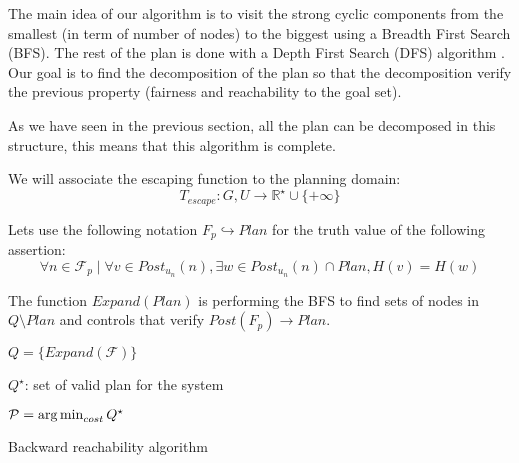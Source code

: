 The main idea of our algorithm is to visit the strong cyclic components from the smallest (in term of number of nodes) to the biggest using a Breadth First Search (BFS). The rest of the plan is done with a Depth First Search (DFS) algorithm .
Our goal is to find the decomposition of the plan so that the decomposition verify the previous property (fairness and reachability to the goal set).

As we have seen in the previous section, all the plan can be decomposed in this structure, this means that this algorithm is complete.

We will associate the escaping function to the planning domain:
\begin{equation}
T_{escape} : G,U \rightarrow \mathbb{R}^\star \cup \{+\infty\}
\end{equation}

Lets use the following notation $F_p \hookrightarrow Plan$ for the truth value of the following assertion:
$$\forall n \in \mathcal{F}_p \mid \forall v \in Post_{u_n}(n), \exists w \in Post_{u_n}(n) \cap Plan, H(v)=H(w)$$

The function $Expand(Plan)$ is performing the BFS to find sets of nodes in $Q \setminus Plan$ and controls that verify $Post(F_p) \rightarrow Plan$.




\begin{algorithm}
\SetAlgoNoLine
{}

 $Q = \{ Expand(\mathcal{F}) \}$\;

 $Q^\star$: set of valid plan for the system\; 
 
 $\mathcal{P} = \operatorname*{arg\,min}_{cost}{Q^\star}$\;
 
 \caption{Backward reachability algorithm}
\end{algorithm}

